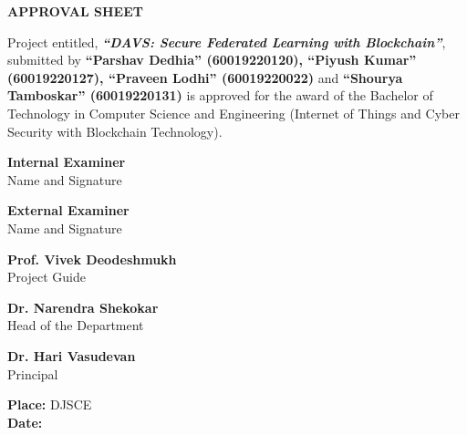 \begin{titlepage}
    \vspace*{1cm}

    \begin{center}
        {\Large \textbf{APPROVAL SHEET}}
    \end{center}

    \vspace{1cm}

    \begin{center}
    Project entitled, \textit{\textbf{“DAVS: Secure Federated Learning with Blockchain”}}, submitted by \textbf{“Parshav Dedhia” (60019220120), “Piyush Kumar” (60019220127), “Praveen Lodhi” (60019220022)} and \textbf{“Shourya Tamboskar” (60019220131)} is approved for the award of the Bachelor of Technology in Computer Science and Engineering (Internet of Things and Cyber Security with Blockchain Technology).
    \end{center}

    \vspace{2cm}

    \noindent
    \begin{minipage}[t]{0.45\textwidth}
        \centering
        \textbf{Internal Examiner} \\
        Name and Signature
    \end{minipage}
    \hfill
    \begin{minipage}[t]{0.45\textwidth}
        \centering
        \textbf{External Examiner} \\
        Name and Signature
    \end{minipage}

    \vspace{2.5cm}

    \noindent
    \begin{minipage}[t]{0.45\textwidth}
        \centering
        \textbf{Prof. Vivek Deodeshmukh} \\
        Project Guide
    \end{minipage}
    \hfill
    \begin{minipage}[t]{0.45\textwidth}
        \centering
        \textbf{Dr. Narendra Shekokar} \\
        Head of the Department
    \end{minipage}

    \vspace{2.5cm}

    \begin{center}
        \textbf{Dr. Hari Vasudevan} \\
        Principal
    \end{center}

    \vspace{1cm}

    \noindent
    \textbf{Place:} DJSCE \hspace{3cm} \\
    \textbf{Date:} \hspace{3cm} 

\end{titlepage}
